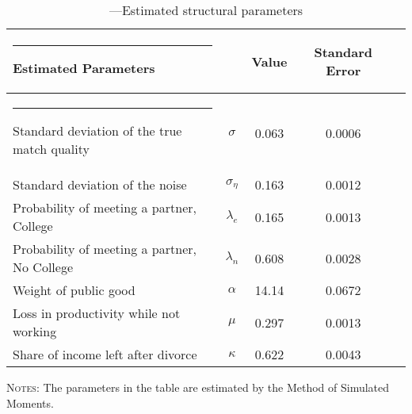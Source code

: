 \documentclass[12pt]{article}
\begin{document}
 \begin{table}[h!]\footnotesize
 	\caption{---Estimated structural parameters} %
 	\label{table:structural_params}
 	\centering %
 	\begin{threeparttable}\footnotesize
 		\begin{tabular}{@{\extracolsep{5pt}}lcccc}   %
 			\hline \hline%
 			\rule{-4pt}{2.5ex}    
 			
 			Estimated Parameters &  & Value & Standard Error  \\ [0.15ex] %
 			\hline
 			\rule{-4pt}{2.5ex}
 			Standard deviation of the true match quality         & $\sigma$  & 0.063 &  0.0006 & \\[0.15ex]
 			Standard deviation of the noise & $\sigma_{\eta}$         & 0.163  &  0.0012& \\[0.15ex]
 			Probability of meeting a partner, College               & $\lambda_e$       & 0.165 & 0.0013 & \\[0.15ex]
 			Probability of meeting a partner, No College               & $\lambda_n$       & 0.608 & 0.0028 &  \\[0.15ex]
 			Weight of public good               & $\alpha$             & 14.14 & 0.0672 & \\[0.15ex]
 			Loss in productivity while not working               & $\mu$             & 0.297 & 0.0013& \\[0.15ex]
 			Share of income left after divorce         &$\kappa$   & 0.622& 0.0043 & \\[0.15ex]
 			\hline
 		\end{tabular}
 		\begin{tablenotes}[flushleft]
 			\scriptsize{\item \textsc{Notes}: The parameters in the table are estimated by the Method of Simulated Moments.}
 		\end{tablenotes}
 	\end{threeparttable}
 \end{table}
\end{document}
